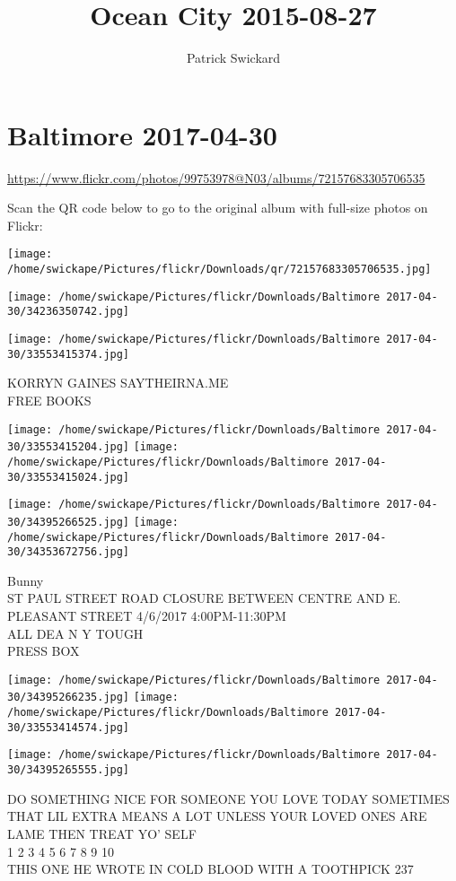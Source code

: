\documentclass[10pt,letterpaper]{article}
\title{Ocean City 2015-08-27}
\author{Patrick Swickard}
\date{}
\begin{document}
\section*{Baltimore 2017-04-30}

\url{https://www.flickr.com/photos/99753978@N03/albums/72157683305706535}

Scan the QR code below to go to the original album with full-size photos on Flickr:

\texttt{[image: /home/swickape/Pictures/flickr/Downloads/qr/72157683305706535.jpg]}
\pagebreak

\texttt{[image: /home/swickape/Pictures/flickr/Downloads/Baltimore 2017-04-30/34236350742.jpg]}

\vspace{0.25in}
\texttt{[image: /home/swickape/Pictures/flickr/Downloads/Baltimore 2017-04-30/33553415374.jpg]}

KORRYN GAINES SAYTHEIRNA.ME\\
FREE BOOKS
\pagebreak

\texttt{[image: /home/swickape/Pictures/flickr/Downloads/Baltimore 2017-04-30/33553415204.jpg]}
\texttt{[image: /home/swickape/Pictures/flickr/Downloads/Baltimore 2017-04-30/33553415024.jpg]}

\texttt{[image: /home/swickape/Pictures/flickr/Downloads/Baltimore 2017-04-30/34395266525.jpg]}
\texttt{[image: /home/swickape/Pictures/flickr/Downloads/Baltimore 2017-04-30/34353672756.jpg]}

Bunny\\
ST PAUL STREET ROAD CLOSURE BETWEEN CENTRE AND E. PLEASANT STREET 4/6/2017 4:00PM{-}11:30PM\\
ALL DEA N Y TOUGH\\
PRESS BOX
\pagebreak

\texttt{[image: /home/swickape/Pictures/flickr/Downloads/Baltimore 2017-04-30/34395266235.jpg]}
\texttt{[image: /home/swickape/Pictures/flickr/Downloads/Baltimore 2017-04-30/33553414574.jpg]}

\texttt{[image: /home/swickape/Pictures/flickr/Downloads/Baltimore 2017-04-30/34395265555.jpg]}

DO SOMETHING NICE FOR SOMEONE YOU LOVE TODAY SOMETIMES THAT LIL EXTRA MEANS A LOT UNLESS YOUR LOVED ONES ARE LAME THEN TREAT YO' SELF\\
1 2 3 4 5 6 7 8 9 10\\
THIS ONE HE WROTE IN COLD BLOOD WITH A TOOTHPICK 237
\pagebreak
\end{document}
